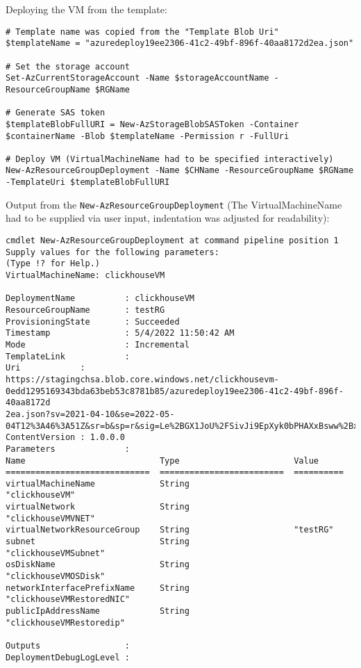 Deploying the VM from the template:
\begin{verbatim}
# Template name was copied from the "Template Blob Uri"
$templateName = "azuredeploy19ee2306-41c2-49bf-896f-40aa8172d2ea.json"

# Set the storage account
Set-AzCurrentStorageAccount -Name $storageAccountName -ResourceGroupName $RGName

# Generate SAS token
$templateBlobFullURI = New-AzStorageBlobSASToken -Container $containerName -Blob $templateName -Permission r -FullUri

# Deploy VM (VirtualMachineName had to be specified interactively)
New-AzResourceGroupDeployment -Name $CHName -ResourceGroupName $RGName -TemplateUri $templateBlobFullURI
\end{verbatim}

Output from the \texttt{New-AzResourceGroupDeployment} (The VirtualMachineName had to be supplied via user input, indentation was adjusted for readability):
\begin{verbatim}
cmdlet New-AzResourceGroupDeployment at command pipeline position 1
Supply values for the following parameters:
(Type !? for Help.)
VirtualMachineName: clickhouseVM

DeploymentName          : clickhouseVM
ResourceGroupName       : testRG
ProvisioningState       : Succeeded
Timestamp               : 5/4/2022 11:50:42 AM
Mode                    : Incremental
TemplateLink            :
Uri            : https://stagingchsa.blob.core.windows.net/clickhousevm-0edd1295169343bda63beb53c8781b85/azuredeploy19ee2306-41c2-49bf-896f-40aa8172d
2ea.json?sv=2021-04-10&se=2022-05-04T12%3A46%3A51Z&sr=b&sp=r&sig=Le%2BGX1JoU%2FSivJi9EpXyk0bPHAXxBsww%2BxY7SpGsP9k%3D
ContentVersion : 1.0.0.0
Parameters              :
Name                           Type                       Value
=============================  =========================  ==========
virtualMachineName             String                     "clickhouseVM"
virtualNetwork                 String                     "clickhouseVMVNET"
virtualNetworkResourceGroup    String                     "testRG"
subnet                         String                     "clickhouseVMSubnet"
osDiskName                     String                     "clickhouseVMOSDisk"
networkInterfacePrefixName     String                     "clickhouseVMRestoredNIC"
publicIpAddressName            String                     "clickhouseVMRestoredip"

Outputs                 :
DeploymentDebugLogLevel :
\end{verbatim}
